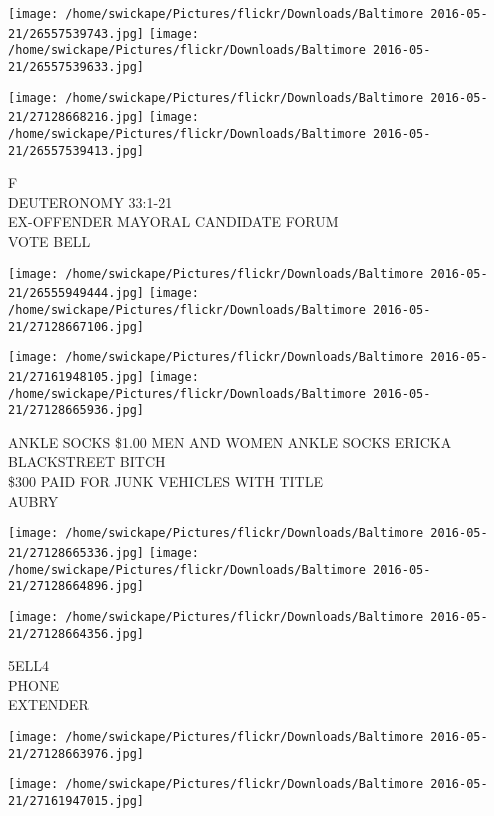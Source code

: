 \documentclass[10pt,letterpaper]{article}
\begin{document}
\texttt{[image: /home/swickape/Pictures/flickr/Downloads/Baltimore 2016-05-21/26557539743.jpg]}
\texttt{[image: /home/swickape/Pictures/flickr/Downloads/Baltimore 2016-05-21/26557539633.jpg]}

\texttt{[image: /home/swickape/Pictures/flickr/Downloads/Baltimore 2016-05-21/27128668216.jpg]}
\texttt{[image: /home/swickape/Pictures/flickr/Downloads/Baltimore 2016-05-21/26557539413.jpg]}

F\\
DEUTERONOMY 33:1{-}21\\
EX{-}OFFENDER MAYORAL CANDIDATE FORUM\\
VOTE BELL\\
\pagebreak

\texttt{[image: /home/swickape/Pictures/flickr/Downloads/Baltimore 2016-05-21/26555949444.jpg]}
\texttt{[image: /home/swickape/Pictures/flickr/Downloads/Baltimore 2016-05-21/27128667106.jpg]}

\texttt{[image: /home/swickape/Pictures/flickr/Downloads/Baltimore 2016-05-21/27161948105.jpg]}
\texttt{[image: /home/swickape/Pictures/flickr/Downloads/Baltimore 2016-05-21/27128665936.jpg]}

ANKLE SOCKS \$1.00 MEN AND WOMEN ANKLE SOCKS ERICKA\\
BLACKSTREET BITCH\\
\$300 PAID FOR JUNK VEHICLES WITH TITLE\\
AUBRY\\
\pagebreak

\texttt{[image: /home/swickape/Pictures/flickr/Downloads/Baltimore 2016-05-21/27128665336.jpg]}
\texttt{[image: /home/swickape/Pictures/flickr/Downloads/Baltimore 2016-05-21/27128664896.jpg]}

\texttt{[image: /home/swickape/Pictures/flickr/Downloads/Baltimore 2016-05-21/27128664356.jpg]}

5ELL4\\
PHONE\\
EXTENDER\\
\pagebreak

\texttt{[image: /home/swickape/Pictures/flickr/Downloads/Baltimore 2016-05-21/27128663976.jpg]}

\vspace{0.25in}
\texttt{[image: /home/swickape/Pictures/flickr/Downloads/Baltimore 2016-05-21/27161947015.jpg]}
\end{document}
